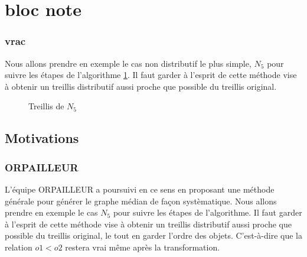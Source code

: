 \part{bloc note}

\section{vrac}

Nous allons prendre en exemple le cas non distributif le plus simple, $N_5$ pour suivre les étapes de l'algorithme \ref{treillis_n5}. Il faut garder à l'esprit de cette méthode vise à obtenir un treillis distributif aussi proche que possible du treillis original.

\begin{figure}[H]
	\begin{center}
	\end{center}
	\caption{Treillis de $N_5$}
	\label{treillis_n5}
\end{figure}

\chapter{Motivations}

\section{ORPAILLEUR}

L'équipe ORPAILLEUR a poursuivi en ce sens \cite{cla2018} en proposant une méthode générale pour générer le graphe médian de façon systèmatique. Nous allons prendre en exemple le cas $N_5$ pour suivre les étapes de l'algorithme. Il faut garder à l'esprit de cette méthode vise à obtenir un treillis distributif aussi proche que possible du treillis original, le tout en garder l'ordre des objets. C'est-à-dire que la relation $o1 < o2$ restera vrai même après la transformation.

